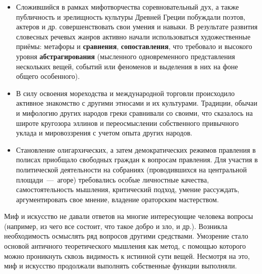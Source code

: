 \begin{itemize}
    \item Сложившийся в рамках мифотворчества соревновательный дух, а также публичность и зрелищность культуры Древней Греции побуждали поэтов, актеров и др. совершенствовать свои умения и навыки. В результате развития словесных речевых жанров активно начали использоваться художественные приёмы: метафоры и \textbf{сравнения}, \textbf{сопоставления}, что требовало и высокого уровня \textbf{абстрагирования} (мысленного одновременного представления нескольких вещей, событий или феноменов и выделения в них на фоне общего особенного).
    \item В силу освоения мореходства и международной торговли происходило активное знакомство с другими этносами и их культурами. Традиции, обычаи и мифологию других народов греки сравнивали со своими, что сказалось на широте кругозора эллинов и переосмыслении собственного привычного уклада и мировоззрения с учетом опыта других народов.
    \item Становление олигархических, а затем демократических режимов правления в полисах приобщало свободных граждан к вопросам правления. Для участия в политической деятельности на собраниях (проводившихся на центральной площади~---~агоре) требовались особые личностные качества, самостоятельность мышления, критический подход, умение рассуждать, аргументировать свое мнение, владение ораторским мастерством.
\end{itemize}

Миф и искусство не давали ответов на многие интересующие человека вопросы (например, из чего все состоит, что такое добро и зло, и др.). Возникла необходимость осмыслять ряд вопросов другими средствами. Умозрение стало основой античного теоретического мышления как метод, с помощью которого можно проникнуть сквозь видимость к истинной сути вещей. Несмотря на это, миф и искусство продолжали выполнять собственные функции выполняли.  




